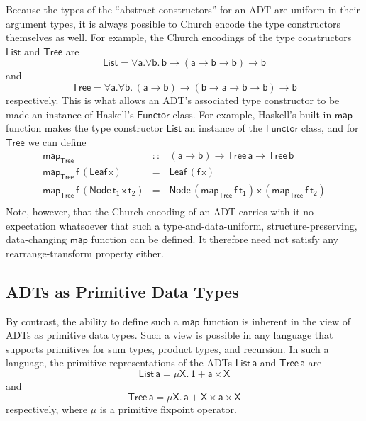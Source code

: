 \documentclass[acmsmall,screen,review,anonymous]{acmart}
\theoremstyle{definition}
\begin{document}
Because the types of the ``abstract constructors'' for an ADT are
uniform in their argument types, it is always possible to Church
encode the type constructors themselves as well. For example, the
Church encodings of the type constructors $\mathsf{List}$ and
$\mathsf{Tree}$ are
\[\mathsf{List} = \mathsf{\forall a. \forall b.\,b \to (a \to b \to b)
  \to b}\] 
and 
\[\mathsf{Tree} = \mathsf{\forall a. \forall b.\,(a \to b) \to (b \to
  a \to b \to b) \to b}\] respectively. This is what allows an ADT's
associated type constructor to be made an instance of Haskell's
$\mathsf{Functor}$ class. For example, Haskell's built-in
$\mathsf{map}$ function makes the type constructor $\mathsf{List}$ an
instance of the $\mathsf{Functor}$ class, and for $\mathsf{Tree}$ we
can define
\[\begin{array}{lll}
\mathsf{map_{Tree}} & \mathsf{::} & \mathsf{(a \to b) \to Tree\,a \to Tree \,b}\\
\mathsf{map_{Tree}\, f\, (Leaf\,x)} & \mathsf{=} & \mathsf{Leaf\,(f\,x)}\\
\mathsf{map_{Tree}\, f\, (Node\,t_1\,x\,t_2)} & \mathsf{=} &
\mathsf{Node\,(map_{Tree}\, f \,t_1)\,x\,(map_{Tree}\,f\,t_2)}\\
\end{array}\]
Note, however, that the Church encoding of an ADT carries with it no
expectation whatsoever that such a type-and-data-uniform,
structure-preserving, data-changing $\mathsf{map}$ function can be
defined. It therefore need not satisfy any rearrange-transform
property either.

\subsection{ADTs as Primitive Data Types}

By contrast, the ability to define such a $\mathsf{map}$ function is
inherent in the view of ADTs as primitive data types. Such a view is
possible in any language that supports primitives for sum types,
product types, and recursion. In such a language, the primitive
representations of the ADTs $\mathsf{List\,a}$ and $\mathsf{Tree\,a}$
are
\begin{equation}\label{eq:list}
  \mathsf{List\,a} = \mathsf{\mu X.\, 1 + a \times X}
\end{equation}
and 
\begin{equation}\label{eq:tree}
  \mathsf{Tree\,a} = \mathsf{\mu X.\, a + X \times a \times X}
\end{equation}
respectively, where $\mathsf{\mu}$ is a primitive fixpoint operator.
\end{document}
